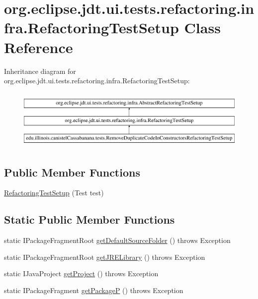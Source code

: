 \hypertarget{classorg_1_1eclipse_1_1jdt_1_1ui_1_1tests_1_1refactoring_1_1infra_1_1RefactoringTestSetup}{
\section{org.eclipse.jdt.ui.tests.refactoring.infra.RefactoringTestSetup Class Reference}
\label{classorg_1_1eclipse_1_1jdt_1_1ui_1_1tests_1_1refactoring_1_1infra_1_1RefactoringTestSetup}
}
Inheritance diagram for org.eclipse.jdt.ui.tests.refactoring.infra.RefactoringTestSetup:\begin{figure}[H]
\begin{center}
\leavevmode
\includegraphics[height=2.962963cm]{classorg_1_1eclipse_1_1jdt_1_1ui_1_1tests_1_1refactoring_1_1infra_1_1RefactoringTestSetup}
\end{center}
\end{figure}
\subsection*{Public Member Functions}
\begin{DoxyCompactItemize}
\item 
\hyperlink{classorg_1_1eclipse_1_1jdt_1_1ui_1_1tests_1_1refactoring_1_1infra_1_1RefactoringTestSetup_ab98e292c8140cdcaf2f52f6077ee493b}{RefactoringTestSetup} (Test test)
\end{DoxyCompactItemize}
\subsection*{Static Public Member Functions}
\begin{DoxyCompactItemize}
\item 
static IPackageFragmentRoot \hyperlink{classorg_1_1eclipse_1_1jdt_1_1ui_1_1tests_1_1refactoring_1_1infra_1_1RefactoringTestSetup_a21b81b45fc32cd1f8cd444bf99db735b}{getDefaultSourceFolder} ()  throws Exception 
\item 
static IPackageFragmentRoot \hyperlink{classorg_1_1eclipse_1_1jdt_1_1ui_1_1tests_1_1refactoring_1_1infra_1_1RefactoringTestSetup_a6dd74dfb11bfe9d9a3da6fc69639cc14}{getJRELibrary} ()  throws Exception 
\item 
static IJavaProject \hyperlink{classorg_1_1eclipse_1_1jdt_1_1ui_1_1tests_1_1refactoring_1_1infra_1_1RefactoringTestSetup_a9dfc033beb53b1c57927c34cfa55b43b}{getProject} ()  throws Exception 
\item 
static IPackageFragment \hyperlink{classorg_1_1eclipse_1_1jdt_1_1ui_1_1tests_1_1refactoring_1_1infra_1_1RefactoringTestSetup_a7a2e2f698828c4814964def5fd938621}{getPackageP} ()  throws Exception 
\end{DoxyCompactItemize}
